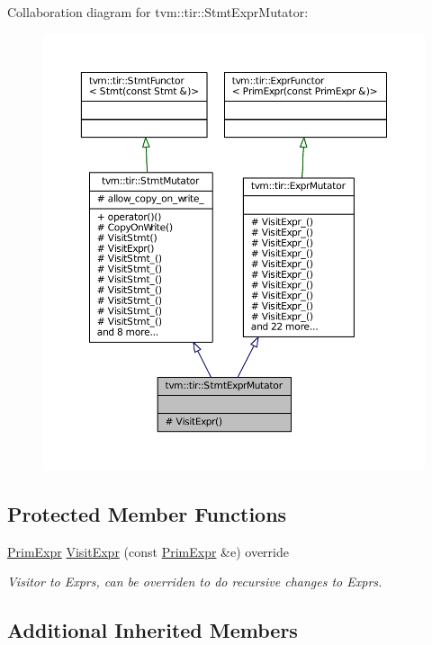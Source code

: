 Collaboration diagram for tvm\+:\+:tir\+:\+:Stmt\+Expr\+Mutator\+:
\nopagebreak
\begin{figure}[H]
\begin{center}
\leavevmode
\includegraphics[width=350pt]{classtvm_1_1tir_1_1StmtExprMutator__coll__graph}
\end{center}
\end{figure}
\subsection*{Protected Member Functions}
\begin{DoxyCompactItemize}
\item 
\hyperlink{classtvm_1_1PrimExpr}{Prim\+Expr} \hyperlink{classtvm_1_1tir_1_1StmtExprMutator_afc4dedb17cb5f2057fc8200e6c298fab}{Visit\+Expr} (const \hyperlink{classtvm_1_1PrimExpr}{Prim\+Expr} \&e) override
\begin{DoxyCompactList}\small\item\em Visitor to Exprs, can be overriden to do recursive changes to Exprs. \end{DoxyCompactList}\end{DoxyCompactItemize}
\subsection*{Additional Inherited Members}


